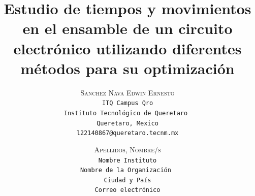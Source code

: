 \lfoot{ \thepage}

\setlength{\droptitle}{-5\baselineskip} %
\title{\textbf{Estudio de tiempos y movimientos en el ensamble de un circuito electrónico utilizando diferentes métodos para su optimización}} %

 \author{ 
 \textsc{Sanchez Nava Edwin Ernesto}\\ 
 \texttt{ ITQ Campus Qro } \\ 
 \texttt{Instituto Tecnológico de Queretaro } \\ 
 \texttt{Queretaro, Mexico}\\ 
 \texttt{l22140867@queretaro.tecnm.mx} 
 \and 
 \textsc{Apellidos, Nombre/s}\\ 
 \texttt{ Nombre Instituto } \\ 
 \texttt{Nombre de la Organización } \\ 
 \texttt{Ciudad y País}\\ 
 \texttt{Correo electrónico} 
}



% 

\maketitle
\thispagestyle{fancy}

